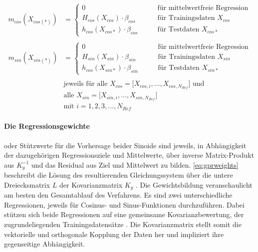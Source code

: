 \begin{align}\label{eq:gprmean}
	m_{cos}(X_{cos(*)}) &=
		\begin{cases}
			0                                    &\qquad \text{für mittelwertfreie Regression} \\
			H_{cos}(X_{cos}) \cdot \beta_{cos} 	 &\qquad \text{für Trainingsdaten } X_{cos} \\
			h_{cos}(X_{cos*}) \cdot \beta_{cos} &\qquad \text{für Testdaten } X_{cos*}
		\end{cases} \nonumber \\
	\\
	m_{sin}(X_{sin(*)}) &=
		\begin{cases}
			0                                    &\qquad \text{für mittelwertfreie Regression} \\
			H_{sin}(X_{sin}) \cdot \beta_{sin} 	 &\qquad \text{für Trainingsdaten } X_{sin} \\
			h_{cos}(X_{sin*}) \cdot \beta_{sin} &\qquad \text{für Testdaten } X_{sin*}
		\end{cases} \nonumber \\
	\nonumber \\
& \text{jeweils für alle } X_{cos} = \big[ X_{cos,i},\dots, X_{cos,N_{Ref}} \big] \text{ und } \nonumber \\
& \text{alle } X_{sin} = \big[ X_{sin,i},\dots, X_{sin,N_{Ref}} \big] \nonumber \\
& \text{mit } i = 1,2,3,\ldots,N_{Ref} \nonumber
\end{align}


\clearpage


\paragraph*{Die Regressionsgewichte} oder Stützwerte für die Vorhersage beider Sinoide sind jeweils, in Abhängigkeit der dazugehörigen Regressionsziele und Mittelwerte, über inverse Matrix-Produkt aus $K_y^{-1}$ und das Residual aus Ziel und Mittelwert zu bilden. \autoref{eq:gprweights} beschreibt die Lösung des resultierenden Gleichungssystem über die untere Dreiecksmatrix $L$ der Kovarianzmatrix $K_y$ \cite{Rasmussen2006}. Die Gewichtsbildung veranschaulicht am besten den Gesamtablauf des Verfahrens. Es sind zwei unterschiedliche Regressionen, jeweils für Cosinus- und Sinus-Funktionen durchzuführen. Dabei stützen sich beide Regressionen auf eine gemeinsame Kovarianzbewertung, der zugrundeliegenden Trainingsdatensätze \cite{Schuethe2020}. Die Kovarianzmatrix stellt somit die vektorielle und orthogonale Kopplung der Daten her und impliziert ihre gegenseitige Abhängigkeit.


